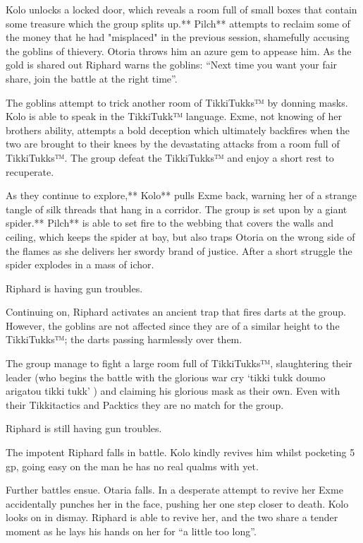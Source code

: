 Kolo unlocks a locked door, which reveals a room full of small boxes that contain some treasure which the group splits up.** Pilch** attempts to reclaim some of the money that he had "misplaced" in the previous session, shamefully accusing the goblins of thievery. Otoria throws him an azure gem to appease him. As the gold is shared out Riphard warns the goblins: “Next time you want your fair share, join the battle at the right time”.\medskip

The goblins attempt to trick another room of TikkiTukks™ by donning masks. Kolo is able to speak in the TikkiTukk™ language. Exme, not knowing of her brothers ability, attempts a bold deception which ultimately backfires when the two are brought to their knees by the devastating attacks from a room full of TikkiTukks™. The group defeat the TikkiTukks™ and enjoy a short rest to recuperate.\medskip

As they continue to explore,** Kolo** pulls Exme back, warning her of a strange tangle of silk threads that hang in a corridor. The group is set upon by a giant spider.** Pilch** is able to set fire to the webbing that covers the walls and ceiling, which keeps the spider at bay, but also traps Otoria on the wrong side of the flames as she delivers her swordy brand of justice. After a short struggle the spider explodes in a mass of ichor.\medskip

Riphard is having gun troubles.\medskip

Continuing on, Riphard activates an ancient trap that fires darts at the group. However, the goblins are not affected since they are of a similar height to the TikkiTukks™; the darts passing harmlessly over them.\medskip

The group manage to fight a large room full of TikkiTukks™, slaughtering their leader (who begins the battle with the glorious war cry ‘tikki tukk doumo arigatou tikki tukk’ ) and claiming his glorious mask as their own. Even with their Tikkitactics and Packtics they are no match for the group.\medskip

Riphard is still having gun troubles.\medskip

The impotent Riphard falls in battle. Kolo kindly revives him whilst pocketing 5 gp, going easy on the man he has no real qualms with yet.\medskip

Further battles ensue. Otaria falls. In a desperate attempt to revive her Exme accidentally punches her in the face, pushing her one step closer to death. Kolo looks on in dismay. Riphard is able to revive her, and the two share a tender moment as he lays his hands on her for “a little too long”.\medskip

